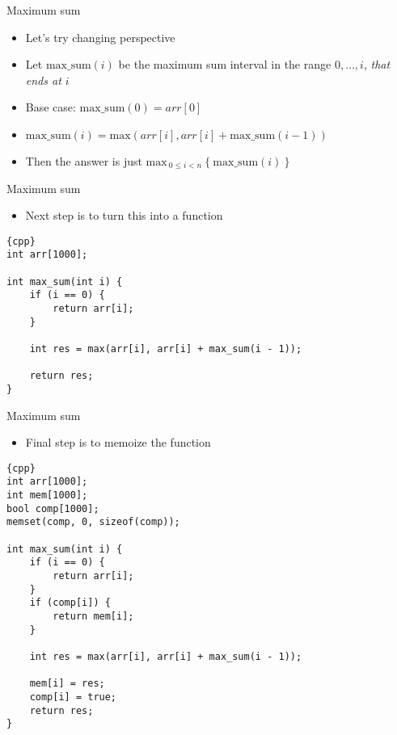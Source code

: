 \begin{frame}[fragile]{Maximum sum}

    \begin{itemize}
        \item Let's try changing perspective
    \item Let $\mathrm{max\_{}sum}(i)$ be the maximum sum interval in the range $0,\ldots,i$, \textit{that ends at $i$}
        \item Base case: $\mathrm{max\_{}sum}(0) = arr[0]$
    \item $\mathrm{max\_{}sum}(i) = \mathrm{max}(arr[i], arr[i] + \mathrm{max\_{}sum}(i - 1))$
        \item Then the answer is just $\mathrm{max}_{\ 0 \leq i < n}\ \{\ \mathrm{max\_{}sum}(i)\ \}$
    \end{itemize}

\end{frame}

\begin{frame}[fragile]{Maximum sum}
    \begin{itemize}
        \item Next step is to turn this into a function
    \end{itemize}

    \begin{lstlisting}{cpp}
int arr[1000];

int max_sum(int i) {
    if (i == 0) {
        return arr[i];
    }

    int res = max(arr[i], arr[i] + max_sum(i - 1));

    return res;
}
    \end{lstlisting}
\end{frame}

\begin{frame}[fragile]{Maximum sum}
    \begin{itemize}
        \item Final step is to memoize the function
    \end{itemize}

    \begin{lstlisting}[basicstyle=\scriptsize]{cpp}
int arr[1000];
int mem[1000];
bool comp[1000];
memset(comp, 0, sizeof(comp));

int max_sum(int i) {
    if (i == 0) {
        return arr[i];
    }
    if (comp[i]) {
        return mem[i];
    }

    int res = max(arr[i], arr[i] + max_sum(i - 1));

    mem[i] = res;
    comp[i] = true;
    return res;
}
    \end{lstlisting}
\end{frame}

